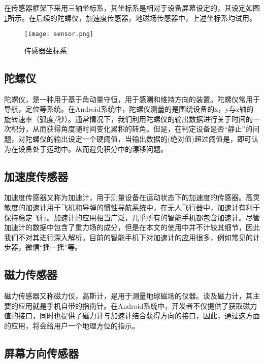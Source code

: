 \documentclass[winfonts]{njuthesis}
\begin{document}
		在传感器框架下采用三轴坐标系，其坐标系是相对于设备屏幕设定的，其设定如图\ref{fig: sensor}所示。在后续的陀螺仪，加速度传感器，地磁场传感器中，上述坐标系均试用。		
		
		\begin{figure}[H]
			\centering
			\texttt{[image: sensor.png]} 
			\caption{传感器坐标系}
			\label{fig: sensor}
		\end{figure}
		
			
		\subsection{陀螺仪}
		
		陀螺仪，是一种用于基于角动量守恒，用于感测和维持方向的装置。陀螺仪常用于导航，定位等系统。在Android系统中，陀螺仪测量的是围绕设备的x，y与z轴的旋转速率（弧度/秒）。通常情况下，我们利用陀螺仪的输出数据进行关于时间的一次积分，从而获得角度随时间变化累积的转角。但是，在判定设备是否“静止”的问题，对陀螺仪的输出设定一个硬阈值，当输出数据的(绝对值)超过阈值是，即可认为在设备处于运动中。从而避免积分中的漂移问题。
			
		\subsection{加速度传感器}
		
		加速度传感器又称为加速计，用于测量设备在运动状态下的加速度的传感器。高灵敏度的加速计用于飞机和导弹的惯性导航系统中，在无人飞行器中，加速计有利于保持稳定飞行。加速计的应用相当广泛，几乎所有的智能手机都包含加速计。尽管加速计的数据中包含了重力场的成分，但是在本文的使用中并不计较其细节，因此我们不对其进行深入解析。目前的智能手机下对加速计的应用很多，例如常见的计步器，微信“摇一摇”等。
						
		\subsection{磁力传感器}
		
		磁力传感器又称磁力仪，高斯计，是用于测量地球磁场的仪器。谈及磁力计，其主要的应用就是手机自带的指南针。在Android系统中，开发者不仅提供了获取磁力值的接口，同时也提供了磁力计与加速计结合获得方向的接口，因此，通过这方面的应用，将会给用户一个地理方位的指示。
			
		\subsection{屏幕方向传感器}
		
\end{document}
